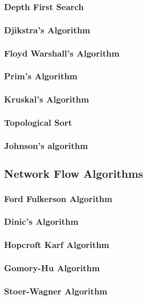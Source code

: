 \documentclass[10pt,landscape,twocolumn]{article}
\begin{document}
\subsubsection{Depth First Search}
\subsubsection{Djikstra's Algorithm}
\subsubsection{Floyd Warshall's Algorithm}
\subsubsection{Prim's Algorithm}
\subsubsection{Kruskal's Algorithm}
\subsubsection{Topological Sort}
\subsubsection{Johnson's algorithm}


\subsection{Network Flow Algorithms}
\subsubsection{Ford Fulkerson Algorithm}
\subsubsection{Dinic's Algorithm}
\subsubsection{Hopcroft Karf Algorithm}
\subsubsection{Gomory-Hu Algorithm}
\subsubsection{Stoer-Wagner Algorithm}
\end{document}
